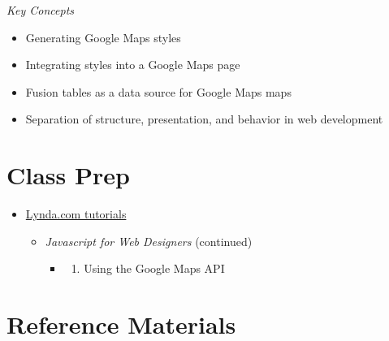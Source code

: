 \documentclass[]{book}
\providecommand{\tightlist}{%
  \setlength{\itemsep}{0pt}\setlength{\parskip}{0pt}}
\begin{document}
\emph{Key Concepts}

\begin{itemize}
\item
  Generating Google Maps styles
\item
  Integrating styles into a Google Maps page
\item
  Fusion tables as a data source for Google Maps maps
\item
  Separation of structure, presentation, and behavior in web development
\end{itemize}

\section{Class Prep}\label{week04-prep}

\begin{itemize}
\item
  \href{http://www.lynda.com/SharedPlaylist/2b710369c9ec4d8c964467225c6610ad?org=unm.edu}{Lynda.com
  tutorials}

  \begin{itemize}
  \tightlist
  \item
    \emph{Javascript for Web Designers} (continued)

    \begin{itemize}
    \item
      \begin{enumerate}
      \def\labelenumi{\arabic{enumi}.}
      \setcounter{enumi}{4}
      \tightlist
      \item
        Using the Google Maps API
      \end{enumerate}
    \end{itemize}
  \end{itemize}
\end{itemize}

\section{Reference Materials}\label{week04-reference}
\end{document}
